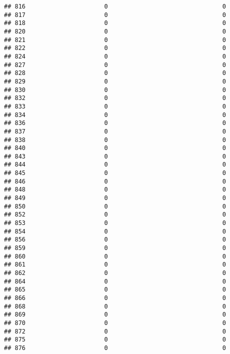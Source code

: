 \documentclass[
]{article}
\begin{document}
\begin{verbatim}
## 816                      0                                0
## 817                      0                                0
## 818                      0                                0
## 820                      0                                0
## 821                      0                                0
## 822                      0                                0
## 824                      0                                0
## 827                      0                                0
## 828                      0                                0
## 829                      0                                0
## 830                      0                                0
## 832                      0                                0
## 833                      0                                0
## 834                      0                                0
## 836                      0                                0
## 837                      0                                0
## 838                      0                                0
## 840                      0                                0
## 843                      0                                0
## 844                      0                                0
## 845                      0                                0
## 846                      0                                0
## 848                      0                                0
## 849                      0                                0
## 850                      0                                0
## 852                      0                                0
## 853                      0                                0
## 854                      0                                0
## 856                      0                                0
## 859                      0                                0
## 860                      0                                0
## 861                      0                                0
## 862                      0                                0
## 864                      0                                0
## 865                      0                                0
## 866                      0                                0
## 868                      0                                0
## 869                      0                                0
## 870                      0                                0
## 872                      0                                0
## 875                      0                                0
## 876                      0                                0

\end{verbatim}
\end{document}
